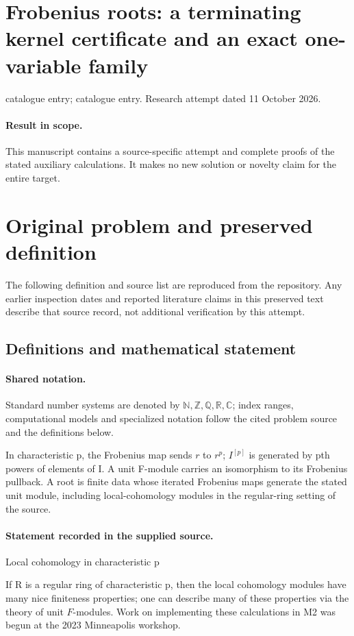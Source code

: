 \documentclass[11pt]{article}
\begin{document}
\section*{Frobenius roots: a terminating kernel certificate and an exact one-variable family}
\noindent catalogue entry; catalogue entry. Research attempt dated 11 October 2026.
\paragraph{Result in scope.}This manuscript contains a source-specific attempt and complete proofs of the stated auxiliary calculations. It makes no new solution or novelty claim for the entire target.
\section{Original problem and preserved definition}
The following definition and source list are reproduced from the repository. Any earlier inspection dates and reported literature claims in this preserved text describe that source record, not additional verification by this attempt.
\subsection{Definitions and mathematical statement}

\paragraph{Shared notation.}Standard number systems are denoted by $\mathbb N,\mathbb Z,\mathbb Q,\mathbb R,\mathbb C$; index ranges, computational models and specialized notation follow the cited problem source and the definitions below.


In characteristic p, the Frobenius map sends $r$ to $r^p$; $I^{[p]}$ is generated by pth powers of elements of I. A unit F-module carries an isomorphism to its Frobenius pullback. A root is finite data whose iterated Frobenius maps generate the stated unit module, including local-cohomology modules in the regular-ring setting of the source.
\paragraph{Statement recorded in the supplied source.}
Local cohomology in characteristic p

If R is a regular ring of characteristic p, then the local cohomology modules have many nice finiteness properties; one can describe many of these properties via the theory of unit $F$-modules. Work on implementing these calculations in M2 was begun at the 2023 Minneapolis workshop.
\end{document}
